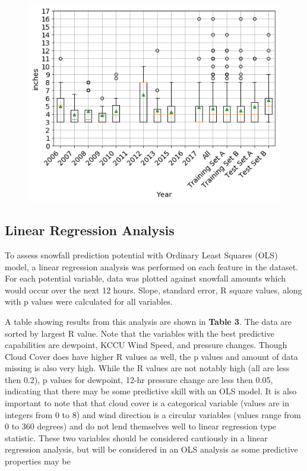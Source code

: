 \documentclass[11pt]{article}
\makeatletter
\def\maxwidth{\ifdim\Gin@nat@width>\linewidth\linewidth
    \else\Gin@nat@width\fi}
\let\Oldincludegraphics\includegraphics
\renewcommand{\includegraphics}[1]{\Oldincludegraphics[width=.8\maxwidth]{#1}}
\makeatother
\begin{document}
\begin{figure}
\centering
\includegraphics{figs/model_snowfall.png}
\caption{}
\end{figure}

\subsection{Linear Regression
Analysis}\label{linear-regression-analysis}

To assess snowfall prediction potential with Ordinary Least Squares
(OLS) model, a linear regression analysis was performed on each feature
in the dataset. For each potential variable, data was plotted against
snowfall amounts which would occur over the next 12 hours. Slope,
standard error, R square values, along with p values were calculated for
all variables.

A table showing results from this analysis are shown in \textbf{Table
3}. The data are sorted by largest R value. Note that the variables with
the best predictive capabilities are dewpoint, KCCU Wind Speed, and
pressure changes. Though Cloud Cover does have higher R values as well,
the p values and amount of data missing is also very high. While the R
values are not notably high (all are less then 0.2), p values for
dewpoint, 12-hr pressure change are less then 0.05, indicating that
there may be some predictive skill with an OLS model. It is also
important to note that that cloud cover is a categorical variable
(values are in integers from 0 to 8) and wind direction is a circular
variables (values range from 0 to 360 degrees) and do not lend
themselves well to linear regression type statistic. These two variables
should be considered cautiously in a linear regression analysis, but
will be considered in an OLS analysis as some predictive properties may
be
\end{document}
